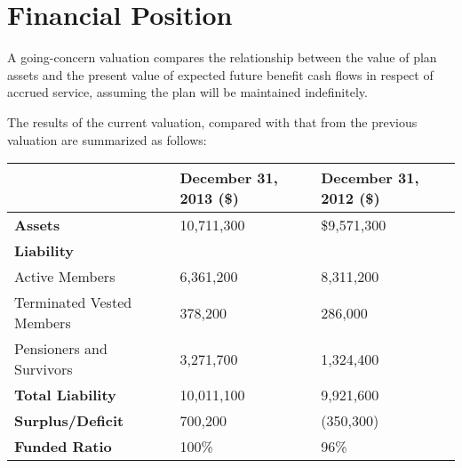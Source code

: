 \documentclass{report}
\begin{document}
\section{Financial Position}
A going-concern valuation compares the relationship between the value of plan assets and the present value of expected future benefit cash flows in respect of accrued service, assuming the plan will be maintained indefinitely.

The results of the current valuation, compared with that from the previous valuation are summarized as follows:

\vspace{3mm}
\bgroup
\normalsize
\def\arraystretch{1.5}
\begin{tabular}{p{5.0cm} p{4.5cm}  p{4.5cm}}
\hline
& \textbf{December 31, 2013 (\$)} & \textbf{December 31, 2012 (\$)} \\ \hline
\textbf{Assets} & 10,711,300 & \$9,571,300 \\ 
\textbf{Liability} \\ 
 \hspace{3mm} Active Members & 6,361,200 & 8,311,200 \\ 
\vspace{-5mm} \hspace{3mm} Terminated Vested Members & \vspace{-5mm} 378,200 & \vspace{-5mm} 286,000 \\ 
\vspace{-5mm}  \hspace{3mm} Pensioners and Survivors & \vspace{-5mm} 3,271,700 & \vspace{-5mm} 1,324,400 \\ 
\textbf{Total Liability} & 10,011,100 & 9,921,600 \\
\hline 
\textbf{Surplus/Deficit} & 700,200 & (350,300) \\ \hline
\textbf{Funded Ratio} & 100\% &  96\% \\ \hline
\end{tabular}
\egroup
\end{document}
